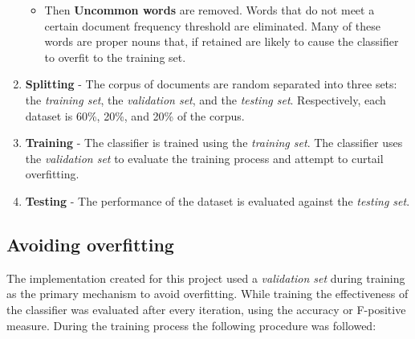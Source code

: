 \documentclass[12pt]{article}
\begin{document}
\begin{enumerate}
\begin{itemize}
            \item Then \textbf{Uncommon words} are removed. Words that do not
                meet a certain document frequency threshold are eliminated.
                Many of these words are proper nouns that, if retained are
                likely to cause the classifier to overfit to the training set.

        \end{itemize}

    \item \textbf{Splitting} - The corpus of documents are random separated
        into three sets: the \textit{training set}, the \textit{validation set},
        and the \textit{testing set}. Respectively, each dataset is 60\%, 20\%,
        and 20\% of the corpus.

    \item \textbf{Training} - The classifier is trained using the
        \textit{training set}.  The classifier uses the \textit{validation set}
        to evaluate the training process and attempt to curtail overfitting.

    \item \textbf{Testing} - The performance of the dataset is evaluated
        against the \textit{testing set}.

\end{enumerate}

\subsection{Avoiding overfitting}

The implementation created for this project used a \textit{validation set} during
training as the primary mechanism to avoid overfitting. While training the
effectiveness of the classifier was evaluated after every iteration, using the
accuracy or F-positive measure. During the training process the following
procedure was followed:
\end{document}

